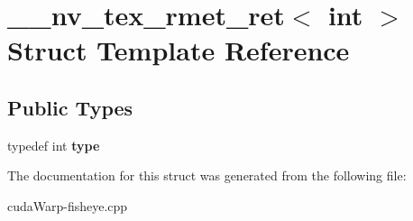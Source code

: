 \hypertarget{struct____nv__tex__rmet__ret_3_01int_01_4}{}\section{\+\_\+\+\_\+nv\+\_\+tex\+\_\+rmet\+\_\+ret$<$ int $>$ Struct Template Reference}
\label{struct____nv__tex__rmet__ret_3_01int_01_4}
\subsection*{Public Types}
\begin{DoxyCompactItemize}
\item 
typedef int {\bfseries type}\hypertarget{struct____nv__tex__rmet__ret_3_01int_01_4_af919e8728839b3053ef700eb08d141cd}{}\label{struct____nv__tex__rmet__ret_3_01int_01_4_af919e8728839b3053ef700eb08d141cd}

\end{DoxyCompactItemize}


The documentation for this struct was generated from the following file\+:\begin{DoxyCompactItemize}
\item 
cuda\+Warp-\/fisheye.\+cpp\end{DoxyCompactItemize}
